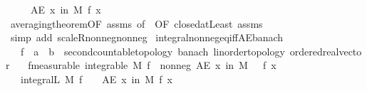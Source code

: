 \begin{isabellebody}
\ \ \ \ \ {\isachardoublequoteopen}AE\ x\ in\ M{\isachardot}{\kern0pt}\ f\ x\ {\isasymge}\ {}{\isachardoublequoteclose}\isanewline
%
\isadelimproof
\ \ %
\endisadelimproof
%
\isatagproof
{}\isamarkupfalse%
\ averaging{\isacharunderscore}{\kern0pt}theorem{\isacharbrackleft}{\kern0pt}OF\ assms{\isacharparenleft}{\kern0pt}{}{\isacharparenright}{\kern0pt}{\isacharcomma}{\kern0pt}\ of\ {\isachardoublequoteopen}{\isacharbraceleft}{\kern0pt}{}{\isachardot}{\kern0pt}{\isachardot}{\kern0pt}{\isacharbraceright}{\kern0pt}{\isachardoublequoteclose}{\isacharcomma}{\kern0pt}\ OF\ closed{\isacharunderscore}{\kern0pt}atLeast{\isacharbrackright}{\kern0pt}\ assms{\isacharparenleft}{\kern0pt}{}{\isacharparenright}{\kern0pt}\isanewline
\ \ \isamarkupfalse%
\ {\isacharparenleft}{\kern0pt}simp\ add{\isacharcolon}{\kern0pt}\ scaleR{\isacharunderscore}{\kern0pt}nonneg{\isacharunderscore}{\kern0pt}nonneg{\isacharparenright}{\kern0pt}%
\endisatagproof
{\isafoldproof}%
%
\isadelimproof
\isanewline
%
\endisadelimproof
\isanewline
{}\isamarkupfalse%
\ integral{\isacharunderscore}{\kern0pt}nonneg{\isacharunderscore}{\kern0pt}eq{\isacharunderscore}{\kern0pt}{}{\isacharunderscore}{\kern0pt}iff{\isacharunderscore}{\kern0pt}AE{\isacharunderscore}{\kern0pt}banach{\isacharcolon}{\kern0pt}\isanewline
\ \ \ f\ {\isacharcolon}{\kern0pt}{\isacharcolon}{\kern0pt}\ {\isachardoublequoteopen}{\isacharprime}{\kern0pt}a\ {\isasymRightarrow}\ {\isacharprime}{\kern0pt}b\ {\isacharcolon}{\kern0pt}{\isacharcolon}{\kern0pt}\ {\isacharbraceleft}{\kern0pt}second{\isacharunderscore}{\kern0pt}countable{\isacharunderscore}{\kern0pt}topology{\isacharcomma}{\kern0pt}\ banach{\isacharcomma}{\kern0pt}\ linorder{\isacharunderscore}{\kern0pt}topology{\isacharcomma}{\kern0pt}\ ordered{\isacharunderscore}{\kern0pt}real{\isacharunderscore}{\kern0pt}vector{\isacharbraceright}{\kern0pt}{\isachardoublequoteclose}\isanewline
\ \ \ f{\isacharbrackleft}{\kern0pt}measurable{\isacharbrackright}{\kern0pt}{\isacharcolon}{\kern0pt}\ {\isachardoublequoteopen}integrable\ M\ f{\isachardoublequoteclose}\ \ nonneg{\isacharcolon}{\kern0pt}\ {\isachardoublequoteopen}AE\ x\ in\ M{\isachardot}{\kern0pt}\ {}\ {\isasymle}\ f\ x{\isachardoublequoteclose}\isanewline
\ \ \ {\isachardoublequoteopen}integral\isactrlsup L\ M\ f\ {\isacharequal}{\kern0pt}\ {}\ {\isasymlongleftrightarrow}\ {\isacharparenleft}{\kern0pt}AE\ x\ in\ M{\isachardot}{\kern0pt}\ f\ x\ {\isacharequal}{\kern0pt}\ {}{\isacharparenright}{\kern0pt}{\isachardoublequoteclose}\isanewline

\end{isabellebody}
